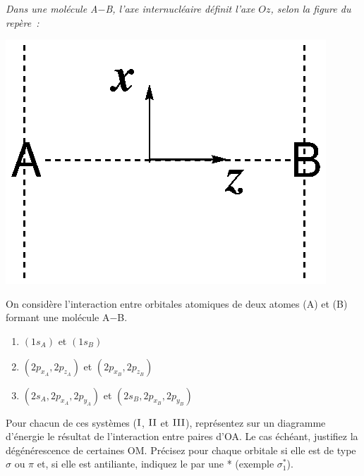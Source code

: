 
\parbox{0.5\textwidth}{\textit{Dans une mol\'ecule A$-$B, l'axe internucl\'eaire 
d\'efinit l'axe $Oz$, selon la figure du rep\`ere~:}}
\parbox{0.5\textwidth}{\centerline{\includegraphics[scale=0.4]{figure/AB_repere.eps}}}

On consid\`ere l'interaction entre orbitales atomiques de deux atomes (A) et (B) formant une mol\'ecule A$-$B.
\begin{enumerate}[~~I.]
\item  $(1s_{A})$   et $(1s_{B})$ 
\item  $(2p_{x_A}, 2p_{z_A})$   et $(2p_{x_B},2p_{z_B})$ 
\item  $(2s_{A},2p_{x_A}, 2p_{y_A})$ et $(2s_{B},2p_{x_B},2p_{y_B})$
\end{enumerate}
Pour chacun de ces  syst\`emes  ($\textsc{I}$, $\textsc{II}$ et $\textsc{III}$), 
repr\'esentez sur un diagramme d'\'energie le r\'esultat de l'interaction entre paires d'OA. 
Le cas \'ech\'eant, justifiez la d\'eg\'en\'erescence de certaines  OM. 
Pr\'ecisez pour chaque orbitale si elle est de type $\sigma$ ou $\pi$ et, si elle est  antiliante, 
indiquez le par une * (exemple $\sigma_1^*$).\\

